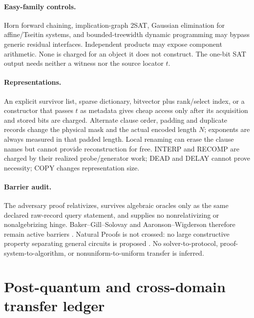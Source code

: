 \documentclass[11pt]{article}
\begin{document}
\paragraph{Easy-family controls.}
Horn forward chaining, implication-graph 2SAT, Gaussian elimination for
affine/Tseitin systems, and bounded-treewidth dynamic programming may bypass
generic residual interfaces.  Independent products may expose component
arithmetic.  None is charged for an object it does not construct.  The
one-bit SAT output needs neither a witness nor the source locator $t$.

\paragraph{Representations.}
An explicit survivor list, sparse dictionary, bitvector plus rank/select
index, or a constructor that passes $t$ as metadata gives cheap access only
after its acquisition and stored bits are charged.  Alternate clause order,
padding and duplicate records change the physical mask and the actual encoded
length $N$; exponents are always measured in that padded length.  Local
renaming can erase the clause names but cannot provide reconstruction for
free.  INTERP and RECOMP are charged by their realized probe/generator work;
DEAD and DELAY cannot prove necessity; COPY changes representation size.

\paragraph{Barrier audit.}
The adversary proof relativizes, survives algebraic oracles only as the same
declared raw-record query statement, and supplies no nonrelativizing or
nonalgebrizing hinge.  Baker--Gill--Solovay and Aaronson--Wigderson therefore
remain active barriers \cite{BGS,AW}.  Natural Proofs is not crossed: no large
constructive property separating general circuits is proposed \cite{RR}.
No solver-to-protocol, proof-system-to-algorithm, or nonuniform-to-uniform
transfer is inferred.

\section{Post-quantum and cross-domain transfer ledger}
\end{document}
